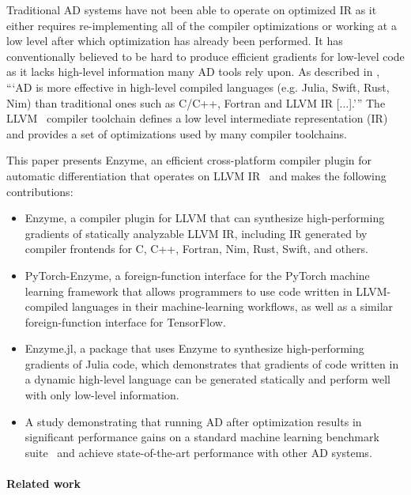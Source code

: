 Traditional AD systems have not been able to operate on optimized IR as it either requires re-implementing all of the compiler optimizations or working at a low level after which optimization has already been performed. It has conventionally believed to be hard to produce efficient gradients for low-level code as it lacks high-level information many AD tools rely upon. As described in \citet{zygoteArxiv}, ```AD is more effective in high-level compiled languages (e.g. Julia, Swift, Rust, Nim) than traditional ones such as C/C++, Fortran and LLVM IR [...].''' The LLVM~\cite{LLVM} compiler toolchain defines a low level intermediate representation (IR) and provides a set of optimizations used by many compiler toolchains.

This paper presents Enzyme, an efficient cross-platform compiler plugin for automatic differentiation that operates on LLVM IR~\cite{LLVM} and makes the following contributions:
\begin{itemize}

\item Enzyme, a compiler plugin for LLVM that can synthesize high-performing gradients of statically analyzable LLVM IR, including IR generated by compiler frontends for C, C++, Fortran, Nim, Rust, Swift, and others.

\item PyTorch-Enzyme, a foreign-function interface for the PyTorch machine learning framework that allows programmers to use code written in LLVM-compiled languages in their machine-learning workflows, as well as a similar foreign-function interface for TensorFlow.

\item Enzyme.jl, a package that uses Enzyme to synthesize high-performing gradients of Julia code, which demonstrates that gradients of code written in a dynamic high-level language can be generated statically and perform well with only low-level information.

\item A study demonstrating that running AD after optimization results in significant performance gains on a standard machine learning benchmark suite~\cite{adBench} and achieve state-of-the-art performance with other AD systems.

\end{itemize}

\paragraph{Related work}

